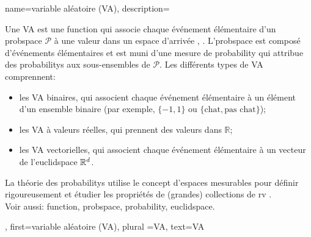 {name={variable aléatoire (VA)},
	description={Une VA est une \gls{function} qui associe chaque événement élémentaire d’un \gls{probspace} $\mathcal{P}$ à une valeur dans un espace d’arrivée \cite{GrayProbBook}, \cite{BillingsleyProbMeasure}.  
		L'\gls{probspace} est composé d’événements élémentaires et est muni d’une mesure de \gls{probability} qui attribue des \glspl{probability} aux sous-ensembles de $\mathcal{P}$.  
		Les différents types de VA comprennent:  
		\begin{itemize} 
			\item les VA binaires, qui associent chaque événement élémentaire à un élément d’un ensemble binaire (par exemple, $\{-1,1\}$ ou $\{\text{chat}, \text{pas chat}\}$); 
			\item les VA à valeurs réelles, qui prennent des valeurs dans $\mathbb{R}$;  
			\item les VA vectorielles, qui associent chaque événement élémentaire à un vecteur de l’\gls{euclidspace} $\mathbb{R}^{d}$.  
		\end{itemize} 
		La théorie des \glspl{probability} utilise le concept d’espaces mesurables pour définir rigoureusement et étudier les propriétés de (grandes) collections de \gls{rv} \cite{BillingsleyProbMeasure}.
		\\ 
		Voir aussi: \gls{function}, \gls{probspace}, \gls{probability}, \gls{euclidspace}.},
	first={variable aléatoire (VA)}, plural ={VA}, text={VA}
}


